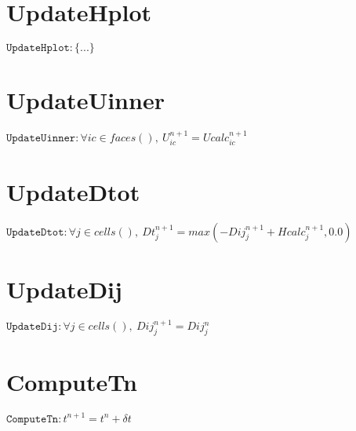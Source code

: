 \documentclass[11pt]{article}
\begin{document}
\section{UpdateHplot}
$\texttt{UpdateHplot} : \{ ... \}$


\section{UpdateUinner}
$\texttt{UpdateUinner} : \forall{ic\in faces()}, \ U^{n+1}_{ic} = Ucalc^{n+1}_{ic}$


\section{UpdateDtot}
$\texttt{UpdateDtot} : \forall{j\in cells()}, \ Dt^{n+1}_{j} = max\left(-Dij^{n+1}_{j} + Hcalc^{n+1}_{j},0.0\right)$


\section{UpdateDij}
$\texttt{UpdateDij} : \forall{j\in cells()}, \ Dij^{n+1}_{j} = Dij^{n}_{j}$


\section{ComputeTn}
$\texttt{ComputeTn} : t^{n+1} = t^{n} + \delta t$
\end{document}
